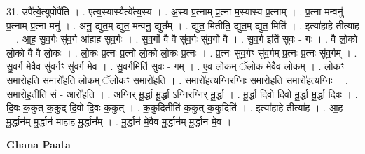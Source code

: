 \documentclass[17pt]{extarticle}
\begin{document}
31. उपै᳚त्ये॒त्युपोपै॑ति । . ए॒त्य॒स्यास्यैत्ये᳚त्य॒स्य । . अ॒स्य प्र॒त्नाम् प्र॒त्ना म॒स्यास्य प्र॒त्नाम् । . प्र॒त्ना मन्वनु॑ प्र॒त्नाम् प्र॒त्ना मनु॑ । . अनु॒ द्युत॒म् द्युत॒ मन्वनु॒ द्युत᳚म् । . द्युत॒ मितीति॒ द्युत॒म् द्युत॒ मिति॑ । . इत्या॑हा॒हे तीत्या॑ह । . आ॒ह॒ सु॒व॒र्गः सु॑व॒र्ग आ॑हाह सुव॒र्गः । . सु॒व॒र्गो वै वै सु॑व॒र्गः सु॑व॒र्गो वै । . सु॒व॒र्ग इति॑ सुवः - गः । . वै लो॒को लो॒को वै वै लो॒कः । . लो॒कः प्र॒त्नः प्र॒त्नो लो॒को लो॒कः प्र॒त्नः । . प्र॒त्नः सु॑व॒र्गꣳ सु॑व॒र्गम् प्र॒त्नः प्र॒त्नः सु॑व॒र्गम् । . सु॒व॒र्ग मे॒वैव सु॑व॒र्गꣳ सु॑व॒र्ग मे॒व । . सु॒व॒र्गमिति॑ सुवः - गम् । . ए॒व लो॒कम् ॅलो॒क मे॒वैव लो॒कम् । . लो॒कꣳ स॒मारो॑हति स॒मारो॑हति लो॒कम् ॅलो॒कꣳ स॒मारो॑हति । . स॒मारो॑हत्य॒ग्निर॒ग्निः स॒मारो॑हति स॒मारो॑हत्य॒ग्निः । . स॒मारो॑ह॒तीति॑ सं - आरो॑हति । . अ॒ग्निर् मू॒र्द्धा मू॒र्द्धा ऽग्निर॒ग्निर् मू॒र्द्धा । . मू॒र्द्धा दि॒वो दि॒वो मू॒र्द्धा मू॒र्द्धा दि॒वः । . दि॒वः क॒कुत् क॒कुद् दि॒वो दि॒वः क॒कुत् । . क॒कुदितीति॑ क॒कुत् क॒कुदिति॑ । . इत्या॑हा॒हे तीत्या॑ह । . आ॒ह॒ मू॒र्द्धान॑म् मू॒र्द्धान॑ माहाह मू॒र्द्धान᳚म् । . मू॒र्द्धान॑ मे॒वैव मू॒र्द्धान॑म् मू॒र्द्धान॑ मे॒व । \newline

\textbf{Ghana Paata } \newline
\end{document}
